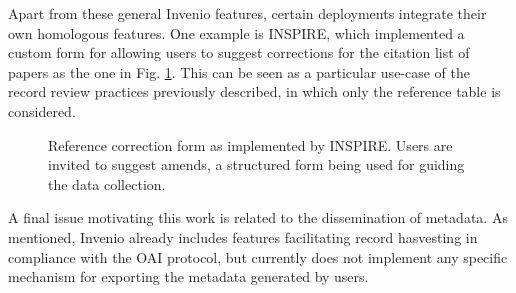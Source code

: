Apart from these general Invenio features, certain deployments integrate their
own homologous features. One example is INSPIRE, which implemented a custom form
for allowing users to suggest corrections for the citation list of papers as the
one in Fig. \ref{fig:inspire}. This can be seen as a particular use-case of the
record review practices previously described, in which only the reference table
is considered.

\begin{figure}[!h]
  \centering
  \caption[Reference correction form as implemented by INSPIRE.]
          {Reference correction form as implemented by INSPIRE. Users are
           invited to suggest amends, a structured form being used for guiding
           the data collection.}
  \label{fig:inspire}
\end{figure}

A final issue motivating this work is related to the dissemination of metadata.
As mentioned, Invenio already includes features facilitating record hasvesting
in compliance with the OAI protocol, but currently does not implement any
specific mechanism for exporting the metadata generated by users.
